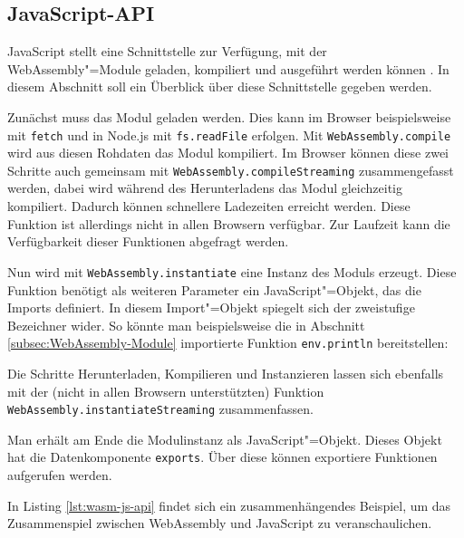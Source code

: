 \subsection{JavaScript-API}
\label{subsec:WebAssembly-JavaScript-API}
JavaScript stellt eine Schnittstelle zur Verfügung, mit der WebAssembly"=Module geladen, kompiliert und ausgeführt werden können \cite{MDNWebAssembly}. In diesem Abschnitt soll ein Überblick über diese Schnittstelle gegeben werden.

Zunächst muss das Modul geladen werden. Dies kann im Browser beispielsweise mit \lstinline{fetch} und in Node.js mit \lstinline{fs.readFile} erfolgen. Mit \lstinline{WebAssembly.compile} wird aus diesen Rohdaten das Modul kompiliert. Im Browser können diese zwei Schritte auch gemeinsam mit \lstinline{WebAssembly.compileStreaming} zusammengefasst werden, dabei wird während des Herunterladens das Modul gleichzeitig kompiliert. Dadurch können schnellere Ladezeiten erreicht werden. Diese Funktion ist allerdings nicht in allen Browsern verfügbar. Zur Laufzeit kann die Verfügbarkeit dieser Funktionen abgefragt werden.

Nun wird mit \lstinline{WebAssembly.instantiate} eine Instanz des Moduls erzeugt. Diese Funktion benötigt als weiteren Parameter ein JavaScript"=Objekt, das die Imports definiert. In diesem Import"=Objekt spiegelt sich der zweistufige Bezeichner wider. So könnte man beispielsweise die in Abschnitt \ref{subsec:WebAssembly-Module} importierte Funktion \lstinline{env.println} bereitstellen:



Die Schritte Herunterladen, Kompilieren und Instanzieren lassen sich ebenfalls mit der (nicht in allen Browsern unterstützten) Funktion \lstinline{WebAssembly.instantiateStreaming} zusammenfassen.

Man erhält am Ende die Modulinstanz als JavaScript"=Objekt. Dieses Objekt hat die Datenkomponente \lstinline{exports}. Über diese können exportiere Funktionen aufgerufen werden.

In Listing \ref{lst:wasm-js-api} findet sich ein zusammenhängendes Beispiel, um das Zusammenspiel zwischen WebAssembly und JavaScript zu veranschaulichen.



